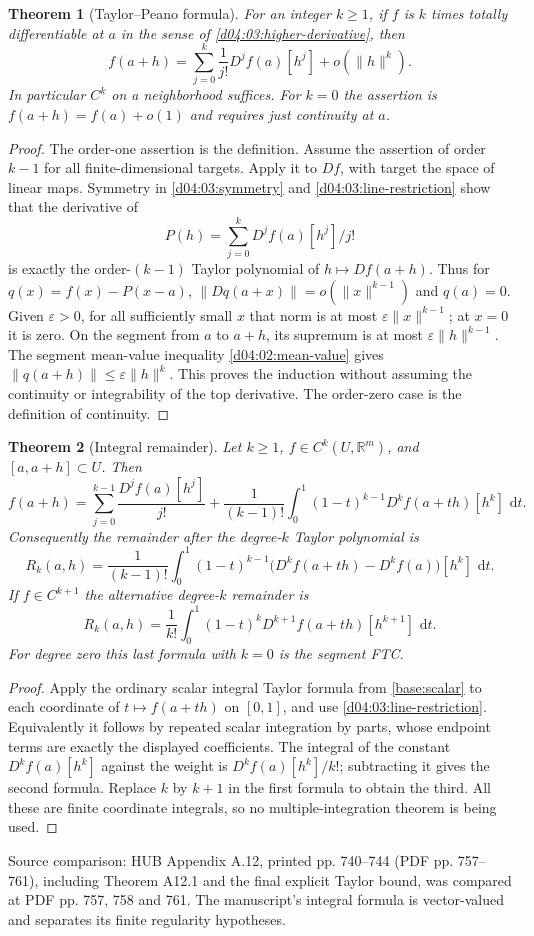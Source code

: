 \documentclass[11pt,oneside,openany]{book}
\newtheorem{theorem}{Theorem}[chapter]
\theoremstyle{definition}
\theoremstyle{remark}
\newcommand{\R}{\mathbb R}
\newcommand{\eps}{\varepsilon}
\newcommand{\norm}[1]{\lVert#1\rVert}
\newcommand{\dd}{\,\mathrm d}
\newcommand{\source}[1]{\par\begingroup\small\sffamily\color{black!65}Source comparison: #1\par\endgroup}
\begin{document}
\begin{theorem}[Taylor--Peano formula]\label{d04:03:taylor-peano}
For an integer $k\geq1$, if $f$ is $k$ times totally differentiable at
$a$ in the sense of \cref{d04:03:higher-derivative}, then
\[
 f(a+h)=\sum_{j=0}^k\frac1{j!}D^jf(a)[h^j]+o(\norm{h}^k).
\]
In particular $C^k$ on a neighborhood suffices. For $k=0$ the assertion
is $f(a+h)=f(a)+o(1)$ and requires just continuity at $a$.
\end{theorem}
\begin{proof}
The order-one assertion is the definition. Assume the assertion of order
$k-1$ for all finite-dimensional targets. Apply it to $Df$, with target the
space of linear maps. Symmetry in \cref{d04:03:symmetry} and
\cref{d04:03:line-restriction} show that the derivative of
\[
 P(h)=\sum_{j=0}^k D^jf(a)[h^j]/j!
\]
is exactly the order-$(k-1)$ Taylor polynomial of $h\mapsto Df(a+h)$.
Thus for $q(x)=f(x)-P(x-a)$,
$\norm{Dq(a+x)}=o(\norm{x}^{k-1})$ and $q(a)=0$.
Given $\eps>0$, for all sufficiently small $x$ that norm is at most
$\eps\norm{x}^{k-1}$; at $x=0$ it is zero. On the segment from $a$ to
$a+h$, its supremum is at most $\eps\norm{h}^{k-1}$.
The segment mean-value inequality \cref{d04:02:mean-value} gives
$\norm{q(a+h)}\leq\eps\norm{h}^k$. This proves the induction without
assuming the continuity or integrability of the top derivative. The order-zero
case is the definition of continuity.
\end{proof}

\begin{theorem}[Integral remainder]\label{d04:03:taylor-integral}
Let $k\geq1$, $f\in C^k(U,\R^m)$, and $[a,a+h]\subset U$. Then
\[
 f(a+h)=\sum_{j=0}^{k-1}\frac{D^jf(a)[h^j]}{j!}
 +\frac1{(k-1)!}\int_0^1(1-t)^{k-1}D^kf(a+th)[h^k]\,\dd t.
\]
Consequently the remainder after the degree-$k$ Taylor polynomial is
\[
 R_k(a,h)=\frac1{(k-1)!}\int_0^1(1-t)^{k-1}
   \big(D^kf(a+th)-D^kf(a)\big)[h^k]\,\dd t.
\]
If $f\in C^{k+1}$ the alternative degree-$k$ remainder is
\[
 R_k(a,h)=\frac1{k!}\int_0^1(1-t)^kD^{k+1}f(a+th)[h^{k+1}]\,\dd t.
\]
For degree zero this last formula with $k=0$ is the segment FTC.
\end{theorem}
\begin{proof}
Apply the ordinary scalar integral Taylor formula from \cref{base:scalar}
to each coordinate of $t\mapsto f(a+th)$ on $[0,1]$, and use
\cref{d04:03:line-restriction}. Equivalently it follows by repeated scalar
integration by parts, whose endpoint terms are exactly the displayed
coefficients. The integral of the constant $D^kf(a)[h^k]$ against the
weight is $D^kf(a)[h^k]/k!$; subtracting it gives the second formula.
Replace $k$ by $k+1$ in the first formula to obtain the third.
All these are finite coordinate integrals, so no multiple-integration
theorem is being used.
\end{proof}
\source{HUB Appendix A.12, printed pp. 740--744 (PDF pp. 757--761),
including Theorem A12.1 and the final explicit Taylor bound, was compared
at PDF pp. 757, 758 and 761. The manuscript's integral formula is
vector-valued and separates its finite regularity hypotheses.}
\end{document}
